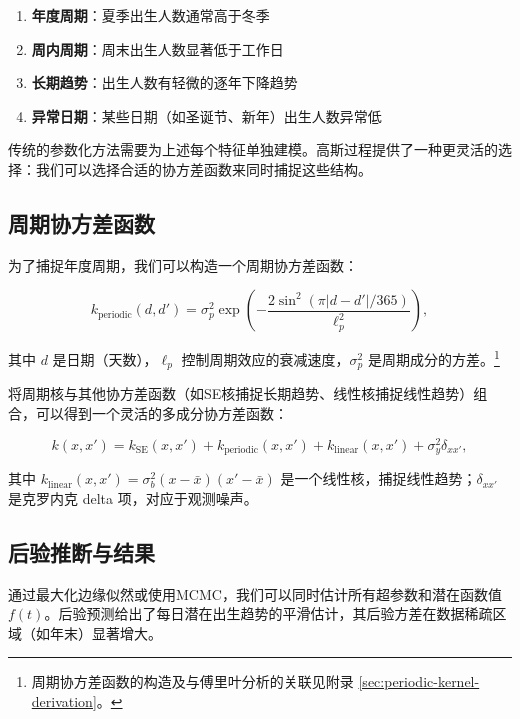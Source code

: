 \begin{enumerate}
  \item \textbf{年度周期}：夏季出生人数通常高于冬季
  \item \textbf{周内周期}：周末出生人数显著低于工作日
  \item \textbf{长期趋势}：出生人数有轻微的逐年下降趋势
  \item \textbf{异常日期}：某些日期（如圣诞节、新年）出生人数异常低
\end{enumerate}

传统的参数化方法需要为上述每个特征单独建模。高斯过程提供了一种更灵活的选择：我们可以选择合适的协方差函数来同时捕捉这些结构。

\subsection{周期协方差函数}

为了捕捉年度周期，我们可以构造一个周期协方差函数：

\begin{equation}
k_{\mathrm{periodic}}(d, d') = \sigma_p^2 \exp\left(-\frac{2 \sin^2(\pi |d - d'| / 365)}{\ell_p^2}\right), \label{eq:periodic-kernel}
\end{equation}

其中 $d$ 是日期（天数），$\ell_p$ 控制周期效应的衰减速度，$\sigma_p^2$ 是周期成分的方差。\footnote{周期协方差函数的构造及与傅里叶分析的关联见附录 \cref{sec:periodic-kernel-derivation}。}

将周期核与其他协方差函数（如SE核捕捉长期趋势、线性核捕捉线性趋势）组合，可以得到一个灵活的多成分协方差函数：

\begin{equation}
k(x, x') = k_{\mathrm{SE}}(x, x') + k_{\mathrm{periodic}}(x, x') + k_{\mathrm{linear}}(x, x') + \sigma_y^2 \delta_{xx'}, \label{eq:gp-composite-kernel}
\end{equation}

其中 $k_{\mathrm{linear}}(x, x') = \sigma_b^2 (x - \bar{x})(x' - \bar{x})$ 是一个线性核，捕捉线性趋势；$\delta_{xx'}$ 是克罗内克 delta 项，对应于观测噪声。

\subsection{后验推断与结果}

通过最大化边缘似然或使用MCMC，我们可以同时估计所有超参数和潜在函数值 $f(t)$。后验预测给出了每日潜在出生趋势的平滑估计，其后验方差在数据稀疏区域（如年末）显著增大。

